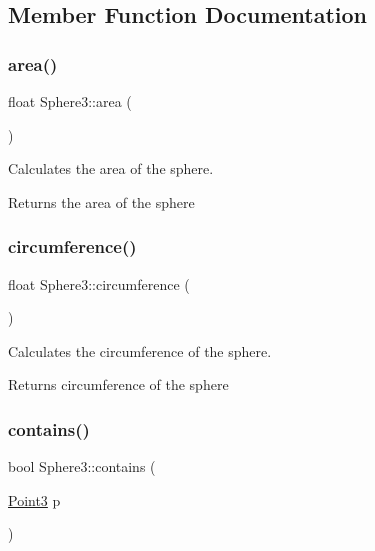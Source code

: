 \subsection{Member Function Documentation}
\mbox{\label{class_sphere3_a9921044730d62a06748f74bfa33512fe}} 
\subsubsection{\texorpdfstring{area()}{area()}}
{\footnotesize\ttfamily float Sphere3\+::area (\begin{DoxyParamCaption}{ }\end{DoxyParamCaption})}



Calculates the area of the sphere. 

\begin{DoxyReturn}{Returns}
the area of the sphere 
\end{DoxyReturn}
\mbox{\label{class_sphere3_af78dd4f8db67d9492926a7cec73c000e}} 
\subsubsection{\texorpdfstring{circumference()}{circumference()}}
{\footnotesize\ttfamily float Sphere3\+::circumference (\begin{DoxyParamCaption}{ }\end{DoxyParamCaption})}



Calculates the circumference of the sphere. 

\begin{DoxyReturn}{Returns}
circumference of the sphere 
\end{DoxyReturn}
\mbox{\label{class_sphere3_a1fa38a829efe96d578cf08a99849a200}} 
\subsubsection{\texorpdfstring{contains()}{contains()}\hspace{0.1cm}{\footnotesize\ttfamily [1/2]}}
{\footnotesize\ttfamily bool Sphere3\+::contains (\begin{DoxyParamCaption}\item[{\mbox{\hyperlink{class_point3}{Point3}}}]{p }\end{DoxyParamCaption})}



